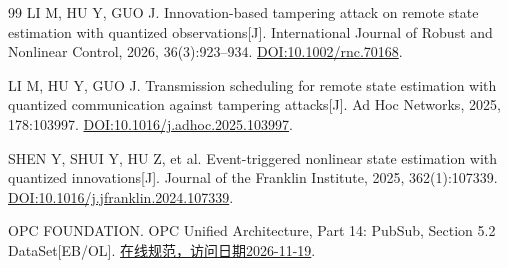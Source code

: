 \begin{thebibliography}{99}
LI M, HU Y, GUO J. Innovation-based tampering attack on remote state estimation with quantized observations[J].
International Journal of Robust and Nonlinear Control, 2026, 36(3):923--934.
\href{https://doi.org/10.1002/rnc.70168}{DOI:10.1002/rnc.70168}.

LI M, HU Y, GUO J. Transmission scheduling for remote state estimation with quantized communication against tampering attacks[J].
Ad Hoc Networks, 2025, 178:103997.
\href{https://doi.org/10.1016/j.adhoc.2025.103997}{DOI:10.1016/j.adhoc.2025.103997}.

SHEN Y, SHUI Y, HU Z, et al. Event-triggered nonlinear state estimation with quantized innovations[J].
Journal of the Franklin Institute, 2025, 362(1):107339.
\href{https://doi.org/10.1016/j.jfranklin.2024.107339}{DOI:10.1016/j.jfranklin.2024.107339}.

OPC FOUNDATION. OPC Unified Architecture, Part 14: PubSub, Section 5.2 DataSet[EB/OL].
\href{https://reference.opcfoundation.org/Core/Part14/v105/docs/5.2}{在线规范，访问日期2026-11-19}.
\end{thebibliography}
